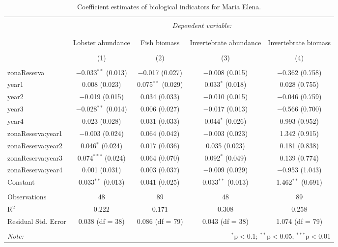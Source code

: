 
\begin{table}[!htbp] \centering 
  \caption{Coefficient estimates of biological indicators for Maria Elena.} 
  \label{} 
\tiny 
\begin{tabular}{@{\extracolsep{1pt}}lcccc} 
\\[-1.8ex]\hline 
\hline \\[-1.8ex] 
 & \multicolumn{4}{c}{\textit{Dependent variable:}} \\ 
\cline{2-5} 
\\[-1.8ex] & \multicolumn{4}{c}{} \\ 
 & Lobster abundance & Fish biomass & Invertebrate abundance & Invertebrate biomass \\ 
\\[-1.8ex] & (1) & (2) & (3) & (4)\\ 
\hline \\[-1.8ex] 
 zonaReserva & $-$0.033$^{**}$ (0.013) & $-$0.017 (0.027) & $-$0.008 (0.015) & $-$0.362 (0.758) \\ 
  year1 & 0.008 (0.023) & 0.075$^{**}$ (0.029) & 0.033$^{*}$ (0.018) & 0.028 (0.755) \\ 
  year2 & $-$0.019 (0.015) & 0.034 (0.033) & $-$0.010 (0.015) & $-$0.046 (0.759) \\ 
  year3 & $-$0.028$^{**}$ (0.014) & 0.006 (0.027) & $-$0.017 (0.013) & $-$0.566 (0.700) \\ 
  year4 & 0.023 (0.028) & 0.031 (0.033) & 0.044$^{*}$ (0.026) & 0.993 (0.952) \\ 
  zonaReserva:year1 & $-$0.003 (0.024) & 0.064 (0.042) & $-$0.003 (0.023) & 1.342 (0.915) \\ 
  zonaReserva:year2 & 0.046$^{*}$ (0.024) & 0.017 (0.036) & 0.035 (0.023) & 0.181 (0.838) \\ 
  zonaReserva:year3 & 0.074$^{***}$ (0.024) & 0.064 (0.070) & 0.092$^{*}$ (0.049) & 0.139 (0.774) \\ 
  zonaReserva:year4 & 0.001 (0.031) & 0.003 (0.037) & $-$0.009 (0.029) & $-$0.953 (1.043) \\ 
  Constant & 0.033$^{**}$ (0.013) & 0.041 (0.025) & 0.033$^{**}$ (0.013) & 1.462$^{**}$ (0.691) \\ 
 \hline \\[-1.8ex] 
Observations & 48 & 89 & 48 & 89 \\ 
R$^{2}$ & 0.222 & 0.171 & 0.308 & 0.258 \\ 
Residual Std. Error & 0.038 (df = 38) & 0.086 (df = 79) & 0.043 (df = 38) & 1.074 (df = 79) \\ 
\hline 
\hline \\[-1.8ex] 
\textit{Note:}  & \multicolumn{4}{r}{$^{*}$p$<$0.1; $^{**}$p$<$0.05; $^{***}$p$<$0.01} \\ 
\end{tabular} 
\end{table} 
